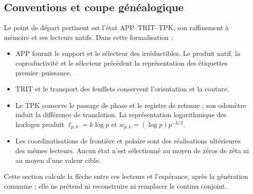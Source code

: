 \subsection{Conventions et coupe généalogique}
\label{gamma-add-sub-32}

Le point de départ pertinent est l'état APP--TRIT--TPK, son raffinement à mémoire et ses lecteurs natifs. Dans cette formalisation :

\begin{itemize}
\item APP fournit le support et le sélecteur des irréductibles. Le produit natif, la coproductivité et le sélecteur précèdent la représentation des étiquettes premier--puissance.
\item TRIT et le transport des feuillets conservent l'orientation et la couture.
\item Le TPK conserve le passage de phase et le registre de retenue ; son odomètre induit la différence de translation. La représentation logarithmique des horloges produit \(\ell_{p,k}=k\log p\) et \(w_{p,k}=(\log p)p^{-k/2}\).
\item Les coordinatisations de frontière et polaire sont des réalisations ultérieures des mêmes lecteurs. Aucun état n'est sélectionné au moyen de zéros de zêta ni au moyen d'une valeur cible.

\end{itemize}
Cette section calcule la flèche entre ces lecteurs et l'espérance, après la génération commune ; elle ne prétend ni reconstruire ni remplacer le continu conjoint.

